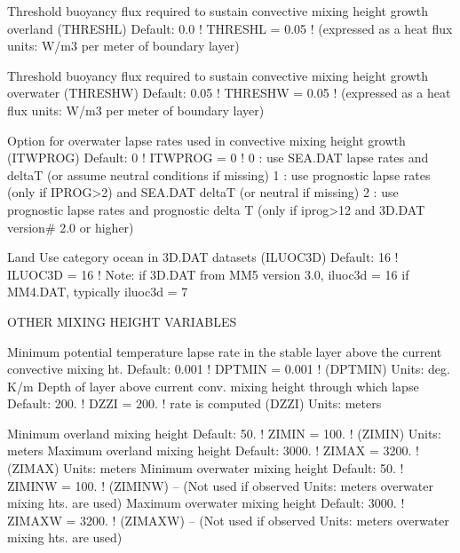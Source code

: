 \documentclass[a4paper,10pt]{article}
\begin{document}
       Threshold buoyancy flux required to
       sustain convective mixing height growth
       overland (THRESHL)                    Default: 0.0    ! THRESHL = 0.05 !
       (expressed as a heat flux             units: W/m3
        per meter of boundary layer)


       Threshold buoyancy flux required to
       sustain convective mixing height growth
       overwater (THRESHW)                   Default: 0.05   ! THRESHW = 0.05 !
       (expressed as a heat flux             units: W/m3
        per meter of boundary layer)


       Option for overwater lapse rates used
       in convective mixing height growth
       (ITWPROG)                             Default: 0      ! ITWPROG =  0  !
       0 : use SEA.DAT lapse rates and deltaT (or assume neutral
           conditions if missing)
       1 : use prognostic lapse rates (only if IPROG>2)
           and SEA.DAT deltaT (or neutral if missing)
       2 : use prognostic lapse rates and prognostic delta T
           (only if iprog>12 and 3D.DAT version# 2.0 or higher)

       Land Use category ocean in 3D.DAT datasets  
       (ILUOC3D)                             Default: 16     ! ILUOC3D =  16  !
       Note: if 3D.DAT from MM5 version 3.0, iluoc3d = 16
             if MM4.DAT,           typically iluoc3d = 7 


    OTHER MIXING HEIGHT VARIABLES

       Minimum potential temperature lapse
       rate in the stable layer above the
       current convective mixing ht.         Default: 0.001  ! DPTMIN = 0.001 !
       (DPTMIN)                              Units: deg. K/m
       Depth of layer above current conv.
       mixing height through which lapse     Default: 200.   ! DZZI = 200. !
       rate is computed (DZZI)               Units: meters

       Minimum overland mixing height        Default:  50.   ! ZIMIN = 100. !
       (ZIMIN)                               Units: meters
       Maximum overland mixing height        Default: 3000.  ! ZIMAX = 3200. !
       (ZIMAX)                               Units: meters
       Minimum overwater mixing height       Default:   50.  ! ZIMINW = 100. !
       (ZIMINW) -- (Not used if observed     Units: meters
       overwater mixing hts. are used)
       Maximum overwater mixing height       Default: 3000.  ! ZIMAXW = 3200. !
       (ZIMAXW) -- (Not used if observed     Units: meters
       overwater mixing hts. are used)
\end{document}
